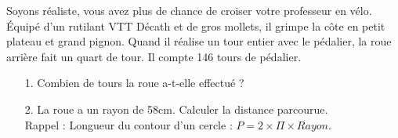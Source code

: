 Soyons réaliste, vous avez plus de chance de croiser votre professeur en vélo. Équipé d'un rutilant VTT Décath et de gros mollets, il grimpe la côte en petit plateau et grand pignon. Quand il réalise un tour entier avec le pédalier, la roue arrière fait un quart de tour. Il compte 146 tours de pédalier. 

\begin{enumerate}
  \item[1.] Combien de tours la roue a-t-elle effectué ?
  \item[2.] La roue a un rayon de 58cm. Calculer la distance parcourue. \\
    Rappel : Longueur du contour d'un cercle : $P = 2 \times \Pi \times Rayon$.   
\end{enumerate}

